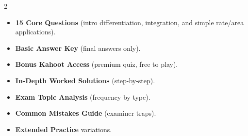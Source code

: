 \documentclass[11pt,a4paper]{article}
\newcommand{\FullReleaseDate}{April 30, 2026}
\begin{document}
\vspace{8pt}

\begin{multicols}{2}
  \begin{tcolorbox}[card, title=\sffamily\bfseries\textcolor{white}{\faHandPointDown\ TODAY (Simplified Version)}, colbacktitle=mainblue, boxed title style={sharp corners, boxrule=0pt}]
    \begin{itemize}[leftmargin=1.2em, itemsep=2pt]
      \item \small \textbf{15 Core Questions} (intro differentiation, integration, and simple rate/area applications).
      \item \small \textbf{Basic Answer Key} (final answers only).
      \item \small \textbf{Bonus Kahoot Access} (premium quiz, free to play).
    \end{itemize}
  \end{tcolorbox}

  \columnbreak

  \begin{tcolorbox}[card, title=\sffamily\bfseries\textcolor{white}{\faRocket\ ON \FullReleaseDate\ (Full Upgrade)}, colbacktitle=mainblue, boxed title style={sharp corners, boxrule=0pt}]
    \begin{itemize}[leftmargin=1.2em, itemsep=2pt]
      \item \small \textbf{In-Depth Worked Solutions} (step-by-step).
      \item \small \textbf{Exam Topic Analysis} (frequency by type).
      \item \small \textbf{Common Mistakes Guide} (examiner traps).
      \item \small \textbf{Extended Practice} variations.
    \end{itemize}
  \end{tcolorbox}
\end{multicols}
\end{document}
